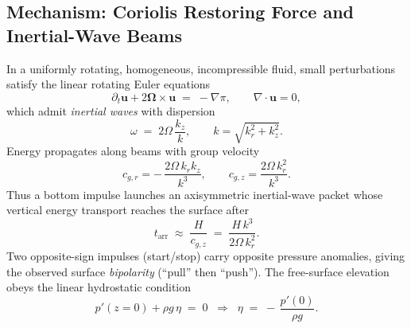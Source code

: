 \documentclass[12pt]{article}
\begin{document}
\subsection{Mechanism: Coriolis Restoring Force and Inertial-Wave Beams}
In a uniformly rotating, homogeneous, incompressible fluid, small perturbations satisfy the linear rotating Euler equations
\begin{equation}
\partial_t \boldsymbol{u} + 2\boldsymbol{\Omega}\!\times\!\boldsymbol{u} \;=\; -\nabla \pi,
\qquad \nabla\!\cdot\!\boldsymbol{u}=0,
\label{eq:rotEuler}
\end{equation}
which admit \emph{inertial waves} with dispersion
\begin{equation}
\omega \;=\; 2\Omega\,\frac{k_z}{k},\qquad k=\sqrt{k_r^2+k_z^2}.
\label{eq:dispersion}
\end{equation}
Energy propagates along beams with group velocity
\begin{equation}
c_{g,r} = -\,\frac{2\Omega\,k_r k_z}{k^3},\qquad
c_{g,z} = \frac{2\Omega\,k_r^2}{k^3}.
\label{eq:group}
\end{equation}
Thus a bottom impulse launches an axisymmetric inertial-wave packet whose vertical energy transport reaches the surface after
\begin{equation}
t_{\mathrm{arr}} \;\approx\; \frac{H}{c_{g,z}}
\;=\; \frac{H\,k^3}{2\Omega\,k_r^2}.
\label{eq:tarr-omega}
\end{equation}
Two opposite-sign impulses (start/stop) carry opposite pressure anomalies, giving the observed surface \emph{bipolarity} (``pull'' then ``push''). The free-surface elevation obeys the linear hydrostatic condition
\begin{equation}
p'(z=0) + \rho g\,\eta \;=\; 0 \;\;\Rightarrow\;\; \eta \;=\; -\,\frac{p'(0)}{\rho g}.
\label{eq:hydrostatic}
\end{equation}
\end{document}
